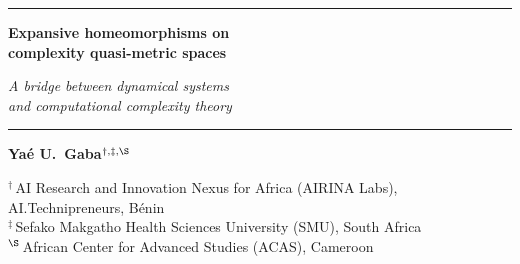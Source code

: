 \documentclass[11pt,a4paper]{article}
\theoremstyle{plain}
\theoremstyle{definition}
\begin{document}
\begin{titlepage}
\thispagestyle{titlepage}
\centering
\vspace*{0.6cm}

{\color{accent}\rule{0.4\textwidth}{0.8pt}}

\vspace{0.8cm}

{\huge\bfseries\color{accent} Expansive homeomorphisms on\\[0.5em]
 complexity quasi-metric spaces}

\vspace{0.5cm}
{\Large\itshape\color{accent!70!black} A bridge between dynamical systems\\[0.2em]
 and computational complexity theory}

\vspace{0.3cm}
{\color{accent}\rule{0.25\textwidth}{0.5pt}}

\vspace{0.8cm}

{\large
\textbf{Ya\'e U.\ Gaba}$^{\dagger,\ddagger,\S}$
}

\vspace{0.3cm}

{\normalsize\color{red!70!black}
\href{https://orcid.org/0000-0001-8128-9704}{\aiOrcid}%
\enspace
\href{https://arxiv.org/a/gaba_y_1.html}{\aiarXiv}%
\enspace
\href{https://scholar.google.com/citations?user=UTszjV4AAAAJ&hl=en}{\aiGoogleScholar}%
}

\vspace{0.5cm}

{\small
$^{\dagger}$\,AI Research and Innovation Nexus for Africa (AIRINA Labs),
AI.Technipreneurs, B\'enin\\[0.3em]
$^{\ddagger}$\,Sefako Makgatho Health Sciences University (SMU),
South Africa\\[0.3em]
$^{\S}$\,African Center for Advanced Studies (ACAS), Cameroon
}


\end{titlepage}
\end{document}
